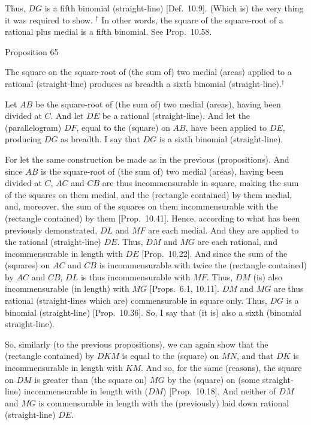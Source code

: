 Thus, $DG$ is a fifth binomial (straight-line) [Def.~10.9]. (Which is) the very thing it was required to show.
{\footnotesize\noindent$^\dag$ In other words, the square of the square-root of a rational plus medial  is a
fifth binomial. See Prop.~10.58.}


\begin{center}
{\large Proposition 65}
\end{center}

The square on the square-root of (the sum of) two medial
(areas) applied to a rational (straight-line) produces as breadth  a sixth binomial (straight-line).$^\dag$

Let $AB$ be the square-root of (the sum of) two medial (areas), having been divided
at $C$. And let $DE$ be a  rational (straight-line). And let the (parallelogram) $DF$, equal to the (square) on $AB$, have been applied to $DE$, producing $DG$
as breadth. I say that $DG$ is a sixth binomial (straight-line).

\epsfysize=1.6in 
\centerline{}

For  let the same construction  be made  as in the previous (propositions). And since $AB$ is the square-root of (the sum of) two medial
(areas), having been divided at $C$, $AC$ and $CB$ are thus incommensurable
in square, making the sum of the squares on them medial, and the (rectangle
contained) by them medial, and, moreover, the sum of the squares on them
incommensurable with the (rectangle contained) by them [Prop.~10.41]. Hence, according to
what has been previously  demonstrated, $DL$ and $MF$ are each medial.
And they are applied to the rational (straight-line) $DE$. Thus, $DM$ and
$MG$ are each rational, and incommensurable in length with $DE$ [Prop.~10.22]. And since the sum of the (squares)
on $AC$ and $CB$ is incommensurable with twice the (rectangle contained)
by $AC$ and $CB$, $DL$ is thus incommensurable with $MF$. Thus,
$DM$ (is) also incommensurable (in length) with $MG$
[Props.~6.1, 10.11]. 
$DM$ and $MG$ are thus rational (straight-lines which are) commensurable
in square only. Thus, $DG$ is a binomial (straight-line) [Prop.~10.36]. So, I say that (it is) also a sixth
(binomial straight-line).

So, similarly (to the previous propositions), we can again show that the (rectangle contained) by $DKM$ is equal to the (square) on $MN$, and that
$DK$ is incommensurable in length with $KM$. And so, for the same (reasons), the square on $DM$ is greater than (the square on) $MG$ by the
(square) on (some straight-line) incommensurable in length with ($DM$) [Prop.~10.18]. And neither of $DM$ and $MG$
is commensurable in length with the (previously) laid down rational (straight-line) $DE$.

